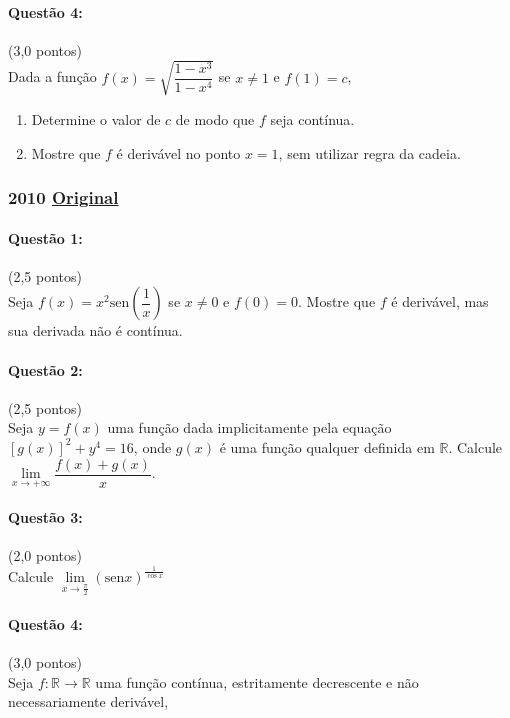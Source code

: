 \documentclass[12pt,a4paper]{article}
\newcommand{\R}{\mathbb{R}}
\newcommand{\original}[1]{\tiny \href{#1}{Original} \normalsize}
\begin{document}
\paragraph{Questão 4:} (3,0 pontos)\\
Dada a função $f(x) = \sqrt{\dfrac{1-x^3}{1-x^4}}$ se $x\neq 1$ e $f(1)=c$, 

\begin{enumerate}[label=(\alph*)]
\item Determine o valor de $c$ de modo que $f$ seja contínua.
\item Mostre que $f$ é derivável no ponto $x=1$, sem utilizar regra da cadeia.
\end{enumerate}

\newpage
\subsubsection{2010  \original{https://drive.google.com/open?id=1vwrcdzuQ7-nUAPLrX78B0JDDdOgpcEIB}}

\paragraph{Questão 1:} (2,5 pontos)\\
Seja $f(x) = x^2 \mathrm{sen} \left(\dfrac{1}{x}\right)$ se $x\neq 0$ e $f(0) = 0$. Mostre que $f$ é derivável, mas sua derivada não é contínua.

\paragraph{Questão 2:} (2,5 pontos)\\
Seja $y=f(x)$ uma função dada implicitamente pela equação $[g(x)]^2 + y^4 = 16$, onde $g(x)$ é uma função qualquer definida em $\R$. Calcule $\lim\limits_{x\to +\infty} \dfrac{f(x)+g(x)}{x}$. 

\paragraph{Questão 3:} (2,0 pontos)\\
Calcule $\lim\limits_{x\to \frac{\pi}{2}} \left(\mathrm{sen}x\right)^{\frac{1}{\cos x}}$ 

\paragraph{Questão 4:} (3,0 pontos)\\
Seja $f:\R \to \R$ uma função contínua, estritamente decrescente e não necessariamente derivável,
\end{document}
